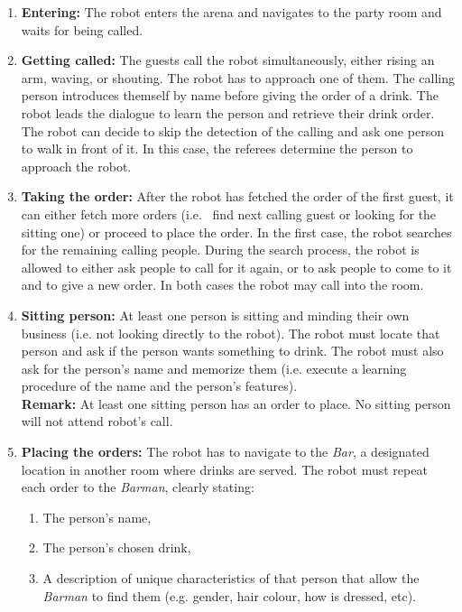 \begin{enumerate}

	\item \textbf{Entering:} The robot enters the arena and navigates to the party room and waits for being called.

	\item \textbf{Getting called:} The guests call the robot simultaneously, either rising an arm, waving, or shouting. The robot has to approach one of them.
	The calling person introduces themself by name before giving the order of a drink. The robot leads the dialogue to learn the person and retrieve their drink order. \\

	The robot can decide to skip the detection of the calling and ask one person to walk in front of it. In this case, the referees determine the person to approach the robot.

	\item \textbf{Taking the order:} After the robot has fetched the order of the first guest, it can either fetch more orders (i.e.~ find next calling guest or looking for the sitting one) or proceed to place the order. In the first case, the robot searches for the remaining calling people. During the search process, the robot is allowed to either ask people to call for it again, or to ask people to come to it and to give a new order. In both cases the robot may call into the room.

	\item \textbf{Sitting person:} At least one person is sitting and minding their own business (i.e. not looking directly to the robot). The robot must locate that person and ask if the person wants something to drink. The robot must also ask for the person's name and memorize them (i.e. execute a learning procedure of the name and the person's features). \\

	\textbf{Remark:} At least one sitting person has an order to place. No sitting person will not attend robot's call.

	\item \textbf{Placing the orders:} The robot has to navigate to the \textit{Bar}, a designated location in another room where drinks are served. The robot must repeat each order to the \textit{Barman}, clearly stating:
	\begin{enumerate}
		\item The person's name,
		\item The person's chosen drink,
		\item A description of unique characteristics of that person that allow the \textit{Barman} to find them (e.g. gender, hair colour, how is dressed, etc).
	\end{enumerate}


\end{enumerate}
